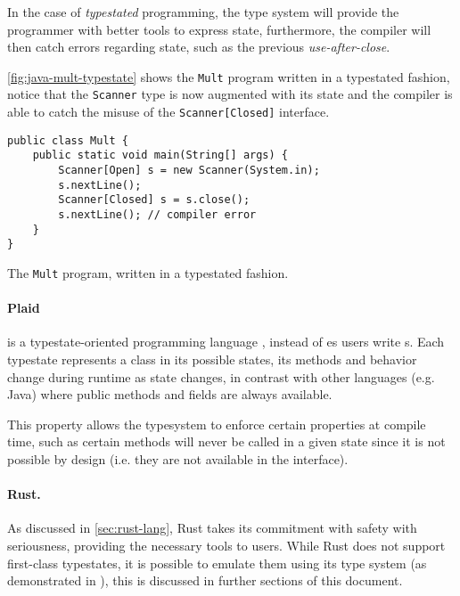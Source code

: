 In the case of \emph{typestated} programming,
the type system will provide the programmer with better tools to express state,
furthermore, the compiler will then catch errors regarding state,
such as the previous \emph{use-after-close}.

\autoref{fig:java-mult-typestate} shows the \texttt{Mult} program written in a typestated fashion,
notice that the \texttt{Scanner} type is now augmented with its state and
the compiler is able to catch the misuse of the \texttt{Scanner[Closed]} interface.


\begin{listing}
    \centering
    \begin{verbatim}
public class Mult {
    public static void main(String[] args) {
        Scanner[Open] s = new Scanner(System.in);
        s.nextLine();
        Scanner[Closed] s = s.close();
        s.nextLine(); // compiler error
    }
}
    \end{verbatim}
    \caption{The \texttt{Mult} program, written in a typestated fashion.}
    \label{fig:java-mult-typestate}
\end{listing}

\paragraph{Plaid} is a typestate-oriented programming language \autocite{Aldrich2009},
instead of es users write s.
Each typestate represents a class in its possible states,
its methods and behavior change during runtime as state changes,
in contrast with other languages (e.g. Java) where public methods and fields are always available.

This property allows the typesystem to enforce certain properties at compile time,
such as certain methods will never be called in a given state since it is not possible by design
(i.e. they are not available in the interface).


\paragraph{Rust.}
As discussed in \autoref{sec:rust-lang}, Rust takes its commitment with safety with seriousness,
providing the necessary tools to users.
While Rust does not support first-class typestates,
it is possible to emulate them using its type system (as demonstrated in \autocite{Duarte2020}),
this is discussed in further sections of this document.

